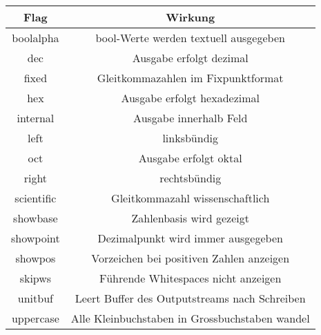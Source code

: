 \begin{center}
    \begin{tabular}{cc}
        \rowcolor[RGB]{239,239,239} 
        \textbf{Flag} & \textbf{Wirkung}                                        \\ \hline
        boolalpha     & bool-Werte werden textuell ausgegeben                   \\
        dec           & Ausgabe erfolgt dezimal                                 \\
        fixed         & Gleitkommazahlen im Fixpunktformat                      \\
        hex           & Ausgabe erfolgt hexadezimal                             \\
        internal      & Ausgabe innerhalb Feld                                  \\
        left          & linksbündig                                             \\
        oct           & Ausgabe erfolgt oktal                                   \\
        right         & rechtsbündig                                            \\
        scientific    & Gleitkommazahl wissenschaftlich                         \\
        showbase      & Zahlenbasis wird gezeigt                                \\
        showpoint     & Dezimalpunkt wird immer ausgegeben                      \\
        showpos       & Vorzeichen bei positiven Zahlen anzeigen                \\
        skipws        & Führende Whitespaces nicht anzeigen                     \\
        unitbuf       & Leert Buffer des Outputstreams nach Schreiben           \\
        uppercase     & Alle Kleinbuchstaben in Grossbuchstaben wandel         
    \end{tabular}
\end{center}


